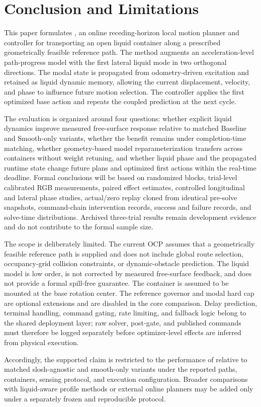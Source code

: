 \section{Conclusion and Limitations}

This paper formulates \SMPCC{}, an online receding-horizon local motion planner and controller for transporting an open liquid container along a prescribed geometrically feasible reference path. The method augments an acceleration-level path-progress \MPCC{} model with the first lateral liquid mode in two orthogonal directions. The modal state is propagated from odometry-driven excitation and retained as liquid dynamic memory, allowing the current displacement, velocity, and phase to influence future motion selection. The controller applies the first optimized base action and repeats the coupled prediction at the next cycle.

The evaluation is organized around four questions: whether explicit liquid dynamics improve measured free-surface response relative to matched Baseline and Smooth-only \MPCC{} variants, whether the benefit remains under completion-time matching, whether geometry-based model reparameterization transfers across containers without weight retuning, and whether liquid phase and the propagated runtime state change future plans and optimized first actions within the real-time deadline. Formal conclusions will be based on randomized blocks, trial-level calibrated RGB measurements, paired effect estimates, controlled longitudinal and lateral phase studies, actual/zero replay cloned from identical pre-solve snapshots, command-chain intervention records, success and failure records, and solve-time distributions. Archived three-trial results remain development evidence and do not contribute to the formal sample size.

The scope is deliberately limited. The current OCP assumes that a geometrically feasible reference path is supplied and does not include global route selection, occupancy-grid collision constraints, or dynamic-obstacle prediction. The liquid model is low order, is not corrected by measured free-surface feedback, and does not provide a formal spill-free guarantee. The container is assumed to be mounted at the base rotation center. The reference governor and modal hard cap are optional extensions and are disabled in the core comparison. Delay prediction, terminal handling, command gating, rate limiting, and fallback logic belong to the shared deployment layer; raw solver, post-gate, and published commands must therefore be logged separately before optimizer-level effects are inferred from physical execution.

Accordingly, the supported claim is restricted to the performance of \SMPCC{} relative to matched slosh-agnostic and smooth-only \MPCC{} variants under the reported paths, containers, sensing protocol, and execution configuration. Broader comparisons with liquid-aware profile methods or external online planners may be added only under a separately frozen and reproducible protocol.


